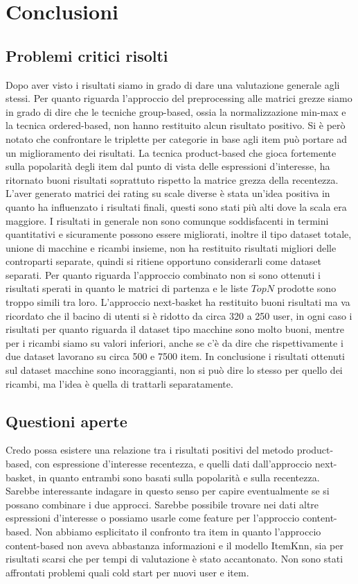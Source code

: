 \hypertarget{(chap:conclusioni)}{}
\chapter{Conclusioni}

\section{Problemi critici risolti}
Dopo aver visto i risultati siamo in grado di dare una valutazione generale agli stessi. Per quanto riguarda l'approccio del preprocessing alle matrici grezze siamo in grado di dire che le tecniche group-based, ossia la normalizzazione min-max e la tecnica ordered-based, non hanno restituito alcun risultato positivo. Si è però notato che confrontare le triplette per categorie in base agli item può portare ad un miglioramento dei risultati.
La tecnica product-based che gioca fortemente sulla popolarità degli item dal punto di vista delle espressioni d'interesse, ha ritornato buoni risultati soprattuto rispetto la matrice grezza della recentezza.\\
L'aver generato matrici dei rating su scale diverse è stata un'idea positiva in quanto ha influenzato i risultati finali, questi sono stati più alti dove la scala era maggiore.
I risultati in generale non sono comunque soddisfacenti in termini quantitativi e sicuramente possono essere migliorati, inoltre il tipo dataset totale, unione di macchine e ricambi insieme, non ha restituito risultati migliori delle controparti separate, quindi si ritiene opportuno considerarli come dataset separati. 
Per quanto riguarda l'approccio combinato non si sono ottenuti i risultati sperati in quanto le matrici di partenza e le liste $TopN$ prodotte sono troppo simili tra loro.
L'approccio next-basket ha restituito buoni risultati ma va ricordato che il bacino di utenti si è ridotto da circa 320 a 250 user, in ogni caso i risultati per quanto riguarda il dataset tipo macchine sono molto buoni, mentre per i ricambi siamo su valori inferiori, anche se c'è da dire che rispettivamente i due dataset lavorano su circa 500 e 7500 item.
In conclusione i risultati ottenuti sul dataset macchine sono incoraggianti, non si può dire lo stesso per quello dei ricambi, ma l'idea è quella di trattarli separatamente.

\section{Questioni aperte}
Credo possa esistere una relazione tra i risultati positivi del metodo product-based, con espressione d'interesse recentezza, e quelli dati dall'approccio next-basket, in quanto entrambi sono basati sulla popolarità e sulla recentezza. Sarebbe interessante indagare in questo senso per capire eventualmente se si possano combinare i due approcci. Sarebbe possibile trovare nei dati altre espressioni d'interesse o possiamo usarle come feature per l'approccio content-based. Non abbiamo esplicitato il confronto tra item in quanto l'approccio content-based non aveva abbastanza informazioni e il modello ItemKnn, sia per risultati scarsi che per tempi di valutazione è stato accantonato. Non sono stati affrontati problemi quali cold start per nuovi user e item.

